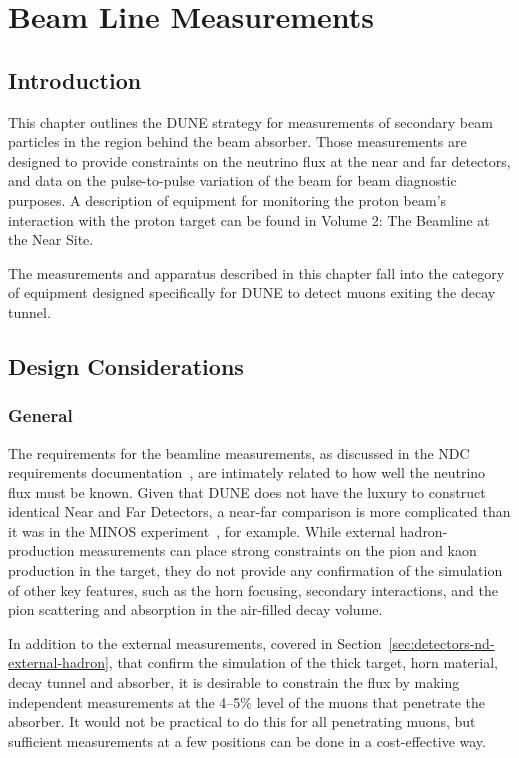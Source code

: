 \section{Beam Line Measurements} 
\label{sec:detectors-nd-ref-blm}

\subsection{Introduction}
\label{subsec:detectors-nd-blm-intro}

This chapter outlines the DUNE strategy for measurements of secondary
beam particles in the region behind the beam absorber. 
Those measurements are designed to provide constraints 
on the neutrino flux at the near and far
detectors, and data on the pulse-to-pulse variation
of the beam for beam diagnostic purposes. A description of equipment
for monitoring the proton beam's interaction with the proton target
can be found in Volume 2: The Beamline at the Near Site. 

The measurements and apparatus described in this chapter fall into
the category of equipment designed specifically for DUNE to
detect muons exiting the decay tunnel. 

\subsection{Design Considerations}
\label{subsec:detectors-nd-blm-design}

\subsubsection{General}
The requirements for the beamline measurements, 
as discussed in the NDC requirements documentation~\cite{nd_requirements_doc}, 
are intimately related to how well the neutrino flux must be known. 
Given that DUNE does not have the luxury to construct identical 
Near and Far Detectors, a near-far comparison is more complicated than it was in
the MINOS experiment~\cite{gnumi-validation}, for example.   
While external hadron-production measurements can place strong 
constraints on the pion and kaon production in the target, they do not 
provide any confirmation of the simulation of other key features, such 
as the horn focusing, secondary interactions, and the 
pion scattering and absorption in the air-filled decay volume. 

In addition to the external measurements, covered in Section~\ref{sec:detectors-nd-external-hadron}, 
that confirm the simulation of the thick target, horn material, decay tunnel and
absorber, it is desirable to constrain the flux by making independent
measurements at the 4--5\% level of the muons that penetrate the absorber. It would not be practical to do this for all penetrating muons, but sufficient measurements at a few positions can be done in a  cost-effective way. 

